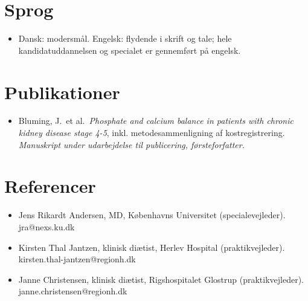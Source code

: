 \documentclass[11pt,a4paper,sans]{moderncv}
\begin{document}

\section{Sprog}
\vspace{1pt}
\begin{itemize}
\item {Dansk: modersmål. Engelsk: flydende i skrift og tale; hele kandidatuddannelsen og specialet er gennemført på engelsk.}
\end{itemize}


\section{Publikationer}
\vspace{1pt}
\begin{itemize}
\item {Bluming, J.\ et al.\ \emph{Phosphate and calcium balance in patients with chronic kidney disease stage 4-5}, inkl. metodesammenligning af kostregistrering. \emph{Manuskript under udarbejdelse til publicering, førsteforfatter.}}
\end{itemize}


\enlargethispage{3\baselineskip}
\section{Referencer}
\vspace{1pt}
\begin{itemize}
\item {Jens Rikardt Andersen, MD, Københavns Universitet (specialevejleder). jra@nexs.ku.dk}
\item {Kirsten Thal Jantzen, klinisk diætist, Herlev Hospital (praktikvejleder). kirsten.thal-jantzen@regionh.dk}
\item {Janne Christensen, klinisk diætist, Rigshospitalet Glostrup (praktikvejleder). janne.christensen@regionh.dk}
\end{itemize}
\end{document}

